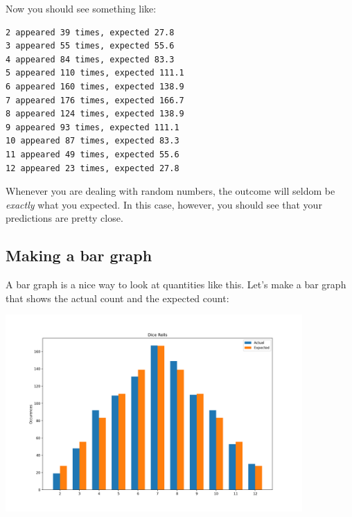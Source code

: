 Now you should see something like:
\begin{Verbatim}
2 appeared 39 times, expected 27.8
3 appeared 55 times, expected 55.6
4 appeared 84 times, expected 83.3
5 appeared 110 times, expected 111.1
6 appeared 160 times, expected 138.9
7 appeared 176 times, expected 166.7
8 appeared 124 times, expected 138.9
9 appeared 93 times, expected 111.1
10 appeared 87 times, expected 83.3
11 appeared 49 times, expected 55.6
12 appeared 23 times, expected 27.8
\end{Verbatim}

Whenever you are dealing with random numbers, the outcome will seldom
be \textit{exactly} what you expected. In this case, however, you should see that your
predictions are pretty close.

\subsection{Making a bar graph}



A bar graph is a nice way to look at quantities like this.  Let's make a bar graph that shows the actual count and the expected count:

\includegraphics[width= 0.85\textwidth]{dice1.png}

